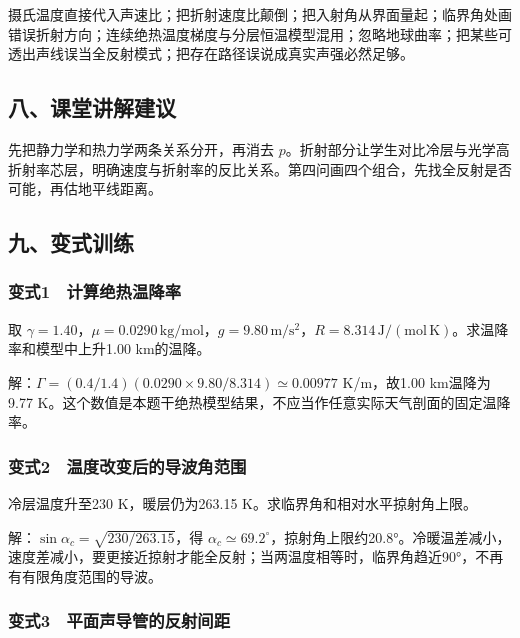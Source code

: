 \documentclass[12pt,a4paper,fontset=fandol]{ctexart}
\begin{document}
摄氏温度直接代入声速比；把折射速度比颠倒；把入射角从界面量起；临界角处画错误折射方向；连续绝热温度梯度与分层恒温模型混用；忽略地球曲率；把某些可透出声线误当全反射模式；把存在路径误说成真实声强必然足够。

\subsection{八、课堂讲解建议}\label{ux516bux8bfeux5802ux8bb2ux89e3ux5efaux8bae-6}

先把静力学和热力学两条关系分开，再消去
\(p\)。折射部分让学生对比冷层与光学高折射率芯层，明确速度与折射率的反比关系。第四问画四个组合，先找全反射是否可能，再估地平线距离。

\subsection{九、变式训练}\label{ux4e5dux53d8ux5f0fux8badux7ec3-6}

\subsubsection{变式1　计算绝热温降率}\label{ux53d8ux5f0f1-ux8ba1ux7b97ux7eddux70edux6e29ux964dux7387}

取
\(\gamma=1.40\)，\(\mu=0.0290\,\mathrm{kg/mol}\)，\(g=9.80\,\mathrm{m/s^2}\)，\(R=8.314\,\mathrm{J/(mol\,K)}\)。求温降率和模型中上升1.00
km的温降。

解：\(\Gamma=(0.4/1.4)(0.0290\times9.80/8.314)\simeq0.00977\)
K/m，故1.00 km温降为9.77
K。这个数值是本题干绝热模型结果，不应当作任意实际天气剖面的固定温降率。

\subsubsection{变式2　温度改变后的导波角范围}\label{ux53d8ux5f0f2-ux6e29ux5ea6ux6539ux53d8ux540eux7684ux5bfcux6ce2ux89d2ux8303ux56f4}

冷层温度升至230 K，暖层仍为263.15 K。求临界角和相对水平掠射角上限。

解：\(\sin\alpha_c=\sqrt{230/263.15}\)，得
\(\alpha_c\simeq69.2^\circ\)，掠射角上限约20.8°。冷暖温差减小，速度差减小，要更接近掠射才能全反射；当两温度相等时，临界角趋近90°，不再有有限角度范围的导波。

\subsubsection{变式3　平面声导管的反射间距}\label{ux53d8ux5f0f3-ux5e73ux9762ux58f0ux5bfcux7ba1ux7684ux53cdux5c04ux95f4ux8ddd}
\end{document}
